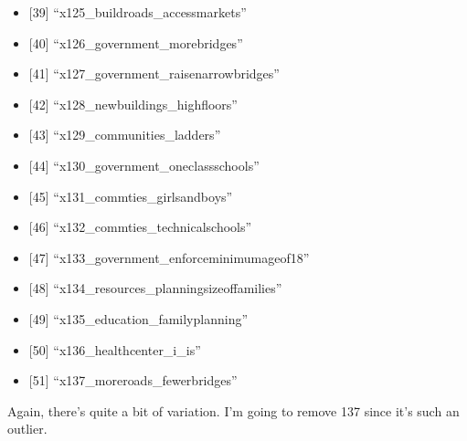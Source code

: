 \documentclass[12pt,]{article}
\providecommand{\tightlist}{%
\setlength{\itemsep}{0pt}\setlength{\parskip}{0pt}}
\begin{document}
\begin{itemize}
\tightlist
\item
  {[}39{]} ``x125\_buildroads\_accessmarkets''\\
\item
  {[}40{]} ``x126\_government\_morebridges''\\
\item
  {[}41{]} ``x127\_government\_raisenarrowbridges''\\
\item
  {[}42{]} ``x128\_newbuildings\_highfloors''\\
\item
  {[}43{]} ``x129\_communities\_ladders''\\
\item
  {[}44{]} ``x130\_government\_oneclassschools''\\
\item
  {[}45{]} ``x131\_commties\_girlsandboys''\\
\item
  {[}46{]} ``x132\_commties\_technicalschools''\\
\item
  {[}47{]} ``x133\_government\_enforceminimumageof18''\\
\item
  {[}48{]} ``x134\_resources\_planningsizeoffamilies''\\
\item
  {[}49{]} ``x135\_education\_familyplanning''\\
\item
  {[}50{]} ``x136\_healthcenter\_i\_is''\\
\item
  {[}51{]} ``x137\_moreroads\_fewerbridges''
\end{itemize}

Again, there's quite a bit of variation. I'm going to remove 137 since
it's such an outlier.
\end{document}
